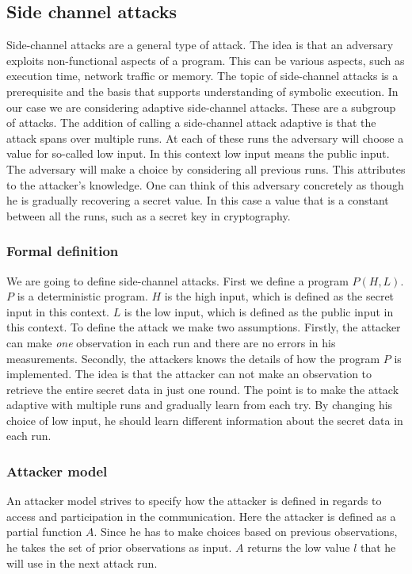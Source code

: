 \documentclass[11pt,a4paper,notitlepage]{article}
\begin{document}
\subsection{Side channel attacks}
\label{sec:sidechannelattacks}

Side-channel attacks are a general type of attack. The idea is that an adversary exploits non-functional aspects of a program. This can be various aspects, such as execution time, network traffic or memory. The topic of side-channel attacks is a prerequisite and the basis that supports understanding of symbolic execution. In our case we are considering adaptive side-channel attacks. These are a subgroup of attacks. The addition of calling a side-channel attack adaptive is that the attack spans over multiple runs. At each of these runs the adversary will choose a value for so-called low input. In this context low input means the public input. The adversary will make a choice by considering all previous runs. This attributes to the attacker's knowledge. One can think of this adversary concretely as though he is gradually recovering a secret value. In this case a value that is a constant between all the runs, such as a secret key in cryptography. 

\subsubsection{Formal definition}

We are going to define side-channel attacks. First we define a program $P(H,L)$. $P$ is a deterministic program. $H$ is the high input, which is defined as the secret input in this context. $L$ is the low input, which is defined as the public input in this context. To define the attack we make two assumptions. Firstly, the attacker can make \textit{one} observation in each run and there are no errors in his measurements. Secondly, the attackers knows the details of how the program $P$ is implemented. The idea is that the attacker can not make an observation to retrieve the entire secret data in just one round. The point is to make the attack adaptive with multiple runs and gradually learn from each try. By changing his choice of low input, he should learn different information about the secret data in each run. 

\subsubsection{Attacker model}

An attacker model strives to specify how the attacker is defined in regards to access and participation in the communication. Here the attacker is defined as a partial function $A$. Since he has to make choices based on previous observations, he takes the set of prior observations as input. $A$ returns the low value $l$ that he will use in the next attack run. 
\end{document}

